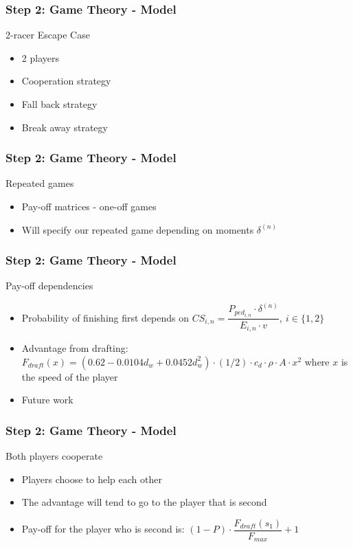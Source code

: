 \documentclass{beamer}
\begin{document}
\begin{frame}
\frametitle{Step 2: Game Theory - Model}
\begin{block}{2-racer Escape Case}
	\begin{itemize}
		\item 2 players
		\item Cooperation strategy
		\item Fall back strategy
		\item Break away strategy
	\end{itemize}
\end{block}
\end{frame}

\begin{frame}
\frametitle{Step 2: Game Theory - Model}
\begin{block}{Repeated games}
	\begin{itemize}
		\item Pay-off matrices - one-off games
		\item Will specify our repeated game depending on moments $\delta^{(n)}$
	\end{itemize}
\end{block}
\end{frame}

\begin{frame}
\frametitle{Step 2: Game Theory - Model}
\begin{block}{Pay-off dependencies}
	\begin{itemize}
		\item Probability of finishing first depends on $CS_{i,n} = \dfrac{P_{ped_{i,n}} \cdot \delta^{(n)}}{E_{i,n} \cdot v},\ i\in\{1,2\}$
		\item Advantage from drafting: $F_{draft}(x) = (0.62 - 0.0104 d_w + 0.0452 d_w^2)\cdot (1/2)\cdot c_d\cdot \rho\cdot A\cdot x^2$ where $x$ is the speed of the player
		\item Future work
	\end{itemize}
\end{block}
\end{frame}

\begin{frame}
\frametitle{Step 2: Game Theory - Model}
\begin{block}{Both players cooperate}
	\begin{itemize}
		\item Players choose to help each other
		\item The advantage will tend to go to the player that is second
		\item Pay-off for the player who is second is: $(1-P)\cdot \dfrac{F_{draft}(s_1)}{F_{max}} + 1$
	\end{itemize}
\end{block}
\end{frame}
\end{document}
